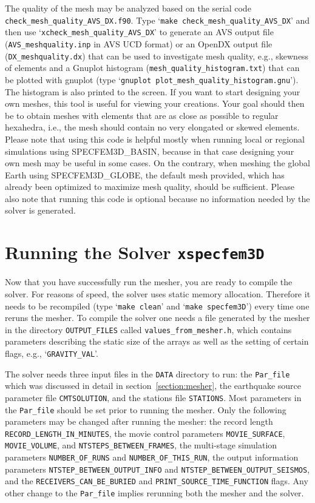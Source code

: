 \documentclass[onecolumn]{article}
\begin{document}
The quality of the mesh may be analyzed based on the serial code
\texttt{check\_mesh\_quality\_AVS\_DX.f90}.
Type `\texttt{make check\_mesh\_quality\_AVS\_DX}' and then use
`\texttt{xcheck\_mesh\_quality\_AVS\_DX}' to generate an AVS output file
(\texttt{AVS\_meshquality.inp} in AVS UCD format)
or an OpenDX output file (\texttt{DX\_meshquality.dx})
that can be used to investigate mesh quality, e.g., skewness of elements
and a Gnuplot histogram (\texttt{mesh\_quality\_histogram.txt}) that can
be plotted with gnuplot (type `\texttt{gnuplot plot\_mesh\_quality\_histogram.gnu}').
The histogram is also printed to the screen.
If you want to start designing your own meshes, this tool is
useful for viewing your creations. Your goal should then be to obtain meshes with
elements that are as close as possible to regular hexahedra,
i.e., the mesh should contain no very elongated or skewed elements.
Please note that using this code is helpful mostly when running local
or regional simulations using SPECFEM3D\_BASIN, because in that case
designing your own mesh may be useful in some cases. On the contrary,
when meshing the global Earth using SPECFEM3D\_GLOBE, the default mesh provided,
which has already been optimized to maximize mesh quality, should be sufficient.
Please also note that running this code is optional because no information needed by the solver is generated.

\section{Running the Solver \texttt{xspecfem3D}}
\label{section:solver}

Now that you have successfully run the mesher, you are ready to compile the solver.
For reasons of speed, the solver uses static memory allocation. Therefore it
needs to be recompiled (type `\texttt{make clean}' and `\texttt{make specfem3D}')
every time one reruns the mesher.
To compile the solver one needs a file generated by the mesher in
the directory \texttt{OUTPUT\_FILES} called
\texttt{values\_from\_mesher.h},
which contains parameters describing the static size of the arrays
as well as the setting of certain flags, e.g., `\texttt{GRAVITY\_VAL}'.

The solver needs three input files in the \texttt{DATA} directory to run:
the \texttt{Par\_file} which was discussed in detail in
section~\ref{section:mesher},
the earthquake source parameter file \texttt{CMTSOLUTION}, and the
stations file \texttt{STATIONS}.
Most parameters in the \texttt{Par\_file} should be set
prior to running the mesher. Only the following parameters may be changed
after running the mesher: the record length \texttt{RECORD\_LENGTH\_IN\_MINUTES},
the movie control parameters \texttt{MOVIE\_SURFACE}, \texttt{MOVIE\_VOLUME},
and \texttt{NTSTEPS\_BETWEEN\_FRAMES}, the multi-stage simulation
parameters \texttt{NUMBER\_OF\_RUNS} and \texttt{NUMBER\_OF\_THIS\_RUN},
the output information parameters \texttt{NTSTEP\_BETWEEN\_OUTPUT\_INFO}
and \texttt{NTSTEP\_BETWEEN\_OUTPUT\_SEISMOS},
and the \texttt{RECEIVERS\_CAN\_BE\_BURIED} and
\texttt{PRINT\_SOURCE\_TIME\_FUNCTION} flags.
Any other change to the \texttt{Par\_file} implies rerunning both
the mesher and the solver.
\end{document}
